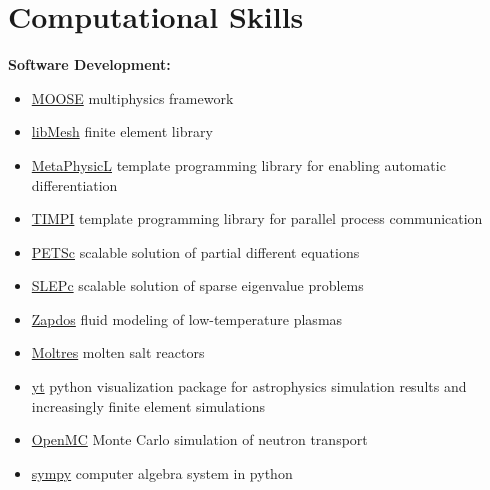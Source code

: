 \documentclass[a4paper,10pt]{article} %
\newcounter{magicrownumbers}
\begin{document}



\setcounter{magicrownumbers}{0}



\FloatBarrier


\section{Computational Skills}

\textbf{Software Development:}
\begin{itemize}[noitemsep]
\item \href{https://github.com/idaholab/moose}{MOOSE} multiphysics framework
\item \href{https://github.com/libmesh/libmesh}{libMesh} finite element library
\item \href{https://github.com/libmesh/metaphysicl}{MetaPhysicL} template
  programming library for enabling automatic differentiation
\item \href{https://github.com/libmesh/timpi}{TIMPI} template programming
  library for parallel process communication
\item \href{https://gitlab.com/petsc/petsc}{PETSc} scalable solution of partial
  different equations
\item \href{https://gitlab.com/slepc/slepc}{SLEPc} scalable solution of sparse
  eigenvalue problems
\item \href{https://github.com/shannon-lab/zapdos}{Zapdos} fluid modeling of low-temperature plasmas
\item \href{https://github.com/arfc/moltres}{Moltres} molten salt reactors
\item \href{https://bitbucket.org/yt/yt\_analysis}{yt} python visualization package for astrophysics simulation results and increasingly finite element simulations
\item \href{https://github.com/mit-crpg/openmc}{OpenMC} Monte Carlo simulation of neutron transport
\item \href{https://github.com/sympy/sympy}{sympy} computer algebra system in python
\end{itemize}
\end{document}
